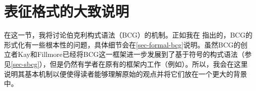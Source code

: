 
\section{表征格式的大致说明}

在这一节，我将讨论伯克利构式语法（BCG）的机制。正如我在 指出的，BCG的形式化有一些根本性的问题，具体细节会在\ref{sec-formal-bcg}说明。虽然BCG的创立者Kay和Fillmore已经将BCG这一框架进一步发展到了基于符号的构式语法（参见\ref{sec-sbcg}），但是仍然有学者在原有的框架内工作（例如\citealp{Fried2013a-u}）。所以，我会在这里说明其基本机制以便使得读者能够理解原始的观点并将它们放在一个更大的背景中。

